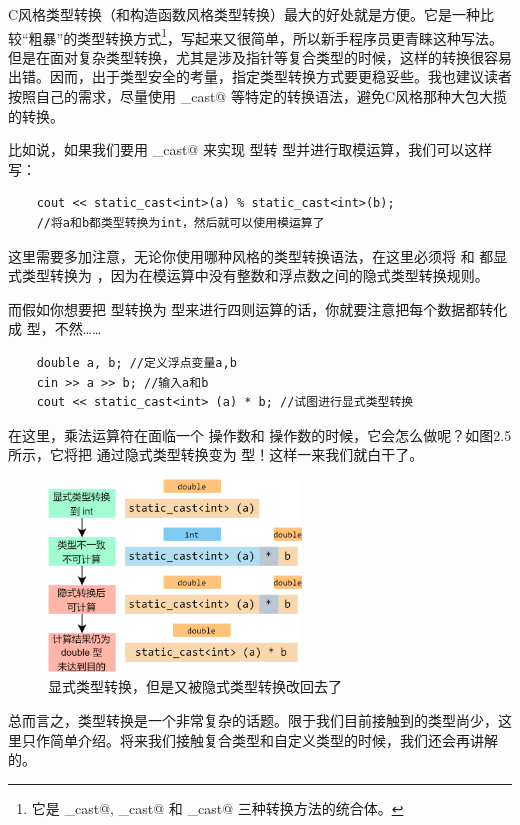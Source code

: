 C风格类型转换（和构造函数风格类型转换）最大的好处就是方便。它是一种比较``粗暴''的类型转换方式\footnote{它是 \lstinline@const_cast@, \lstinline@static_cast@ 和 \lstinline@reinterpret_cast@ 三种转换方法的统合体。}，写起来又很简单，所以新手程序员更青睐这种写法。但是在面对复杂类型转换，尤其是涉及指针等复合类型的时候，这样的转换很容易出错。因而，出于类型安全的考量，指定类型转换方式要更稳妥些。我也建议读者按照自己的需求，尽量使用 \lstinline@static_cast@ 等特定的转换语法，避免C风格那种大包大揽的转换。\par
比如说，如果我们要用 \lstinline@static_cast@ 来实现 \lstinline@double@ 型转 \lstinline@int@ 型并进行取模运算，我们可以这样写：
\begin{lstlisting}
    cout << static_cast<int>(a) % static_cast<int>(b);
    //将a和b都类型转换为int，然后就可以使用模运算了
\end{lstlisting}
这里需要多加注意，无论你使用哪种风格的类型转换语法，在这里必须将 \lstinline@a@ 和 \lstinline@b@ 都显式类型转换为 \lstinline@int@，因为在模运算中没有整数和浮点数之间的隐式类型转换规则。\par
而假如你想要把 \lstinline@double@ 型转换为 \lstinline@int@ 型来进行四则运算的话，你就要注意把每个数据都转化成 \lstinline@int@ 型，不然……
\begin{lstlisting}
    double a, b; //定义浮点变量a,b
    cin >> a >> b; //输入a和b
    cout << static_cast<int> (a) * b; //试图进行显式类型转换
\end{lstlisting}
在这里，乘法运算符在面临一个 \lstinline@int@ 操作数和 \lstinline@double@ 操作数的时候，它会怎么做呢？如图2.5所示，它将把 \lstinline@int@ 通过隐式类型转换变为 \lstinline@double@ 型！这样一来我们就白干了。\par
\begin{figure}[htbp]
    \centering
    \includegraphics[width=0.6\textwidth]{../images/generalized_parts/02_Explicit_type_cast_from_double_to_int_in_vain.drawio.png}
    \caption{显式类型转换，但是又被隐式类型转换改回去了}
\end{figure}
总而言之，类型转换是一个非常复杂的话题。限于我们目前接触到的类型尚少，这里只作简单介绍。将来我们接触复合类型和自定义类型的时候，我们还会再讲解的。\par
